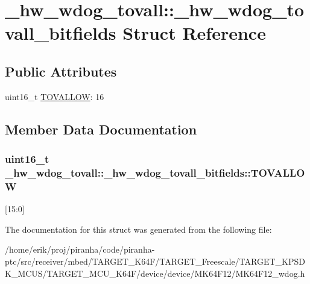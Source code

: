 \hypertarget{struct__hw__wdog__tovall_1_1__hw__wdog__tovall__bitfields}{}\section{\+\_\+hw\+\_\+wdog\+\_\+tovall\+:\+:\+\_\+hw\+\_\+wdog\+\_\+tovall\+\_\+bitfields Struct Reference}
\label{struct__hw__wdog__tovall_1_1__hw__wdog__tovall__bitfields}
\subsection*{Public Attributes}
\begin{DoxyCompactItemize}
\item 
uint16\+\_\+t \hyperlink{struct__hw__wdog__tovall_1_1__hw__wdog__tovall__bitfields_a92c7cb0670bc5eb7ee4d3375db8ad82f}{T\+O\+V\+A\+L\+L\+OW}\+: 16
\end{DoxyCompactItemize}


\subsection{Member Data Documentation}
\subsubsection[{\texorpdfstring{T\+O\+V\+A\+L\+L\+OW}{TOVALLOW}}]{\setlength{\rightskip}{0pt plus 5cm}uint16\+\_\+t \+\_\+hw\+\_\+wdog\+\_\+tovall\+::\+\_\+hw\+\_\+wdog\+\_\+tovall\+\_\+bitfields\+::\+T\+O\+V\+A\+L\+L\+OW}\hypertarget{struct__hw__wdog__tovall_1_1__hw__wdog__tovall__bitfields_a92c7cb0670bc5eb7ee4d3375db8ad82f}{}\label{struct__hw__wdog__tovall_1_1__hw__wdog__tovall__bitfields_a92c7cb0670bc5eb7ee4d3375db8ad82f}
\mbox{[}15\+:0\mbox{]} 

The documentation for this struct was generated from the following file\+:\begin{DoxyCompactItemize}
\item 
/home/erik/proj/piranha/code/piranha-\/ptc/src/receiver/mbed/\+T\+A\+R\+G\+E\+T\+\_\+\+K64\+F/\+T\+A\+R\+G\+E\+T\+\_\+\+Freescale/\+T\+A\+R\+G\+E\+T\+\_\+\+K\+P\+S\+D\+K\+\_\+\+M\+C\+U\+S/\+T\+A\+R\+G\+E\+T\+\_\+\+M\+C\+U\+\_\+\+K64\+F/device/device/\+M\+K64\+F12/M\+K64\+F12\+\_\+wdog.\+h\end{DoxyCompactItemize}
